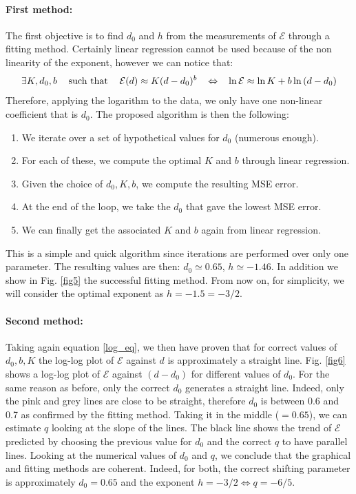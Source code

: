 \documentclass[11pt,titlepage]{article}
\begin{document}
\paragraph{First method:}
The first objective is to find $d_0$ and $h$ from the measurements of $\mathcal{E}$ through a fitting method. Certainly linear regression cannot be used because of the non linearity of the exponent, however we can notice that:
\begin{equation}\label{log_eq}
	\exists K, d_0, b \hspace{3mm} \text{ such that } \hspace{3mm} \mathcal{E}(d) \approx K(d-d_0)^b \hspace{3mm} \Leftrightarrow \hspace{3mm} \ln{\mathcal{E}} \approx \ln{K} + b \ln{(d-d_0)}
\end{equation}
Therefore, applying the logarithm to the data, we only have one non-linear coefficient that is $d_0$. The proposed algorithm is then the following: 
\begin{enumerate}
	\item We iterate over a set of hypothetical values for $d_0$ (numerous enough).
	\item For each of these, we compute the optimal $K$ and $b$ through linear regression.
	\item Given the choice of $d_0,K,b$, we compute the resulting MSE error.
	\item At the end of the loop, we take the $d_0$ that gave the lowest MSE error.
	\item We can finally get the associated $K$ and $b$ again from linear regression.
\end{enumerate}
	This is a simple and quick algorithm since iterations are performed over only one parameter. The resulting values are then: $d_0 \simeq 0.65$, $h \simeq -1.46$. In addition we show in Fig. \ref{fig5} the successful fitting method. From now on,  for simplicity, we will consider the optimal exponent as $h=-1.5 = -3/2$. 

\paragraph{Second method:}
Taking again equation \ref{log_eq}, we then have proven that for correct values of $d_0,b,K$ the log-log plot of $\mathcal{E}$ against $d$ is approximately a straight line. Fig. \ref{fig6} shows a  log-log plot of $\mathcal{E}$ against $(d-d_0)$ for different values of $d_0$. For the same reason as before, only the correct $d_0$ generates a straight line. Indeed, only the pink and grey lines are close to be straight, therefore $d_0$ is between 0.6 and 0.7 as confirmed by the fitting method. Taking it in the middle ($=0.65$), we can estimate $q$ looking at the slope of the lines. The black line shows the trend of $\mathcal{E}$ predicted by choosing the previous value for $d_0$ and the correct $q$ to have parallel lines. Looking at the numerical values of $d_0$ and $q$, we conclude that the graphical and fitting methods are coherent. Indeed, for both, the correct shifting parameter is approximately $d_0=0.65$ and the exponent $h=-3/2 \Leftrightarrow q = -6/5$. 
\end{document}
